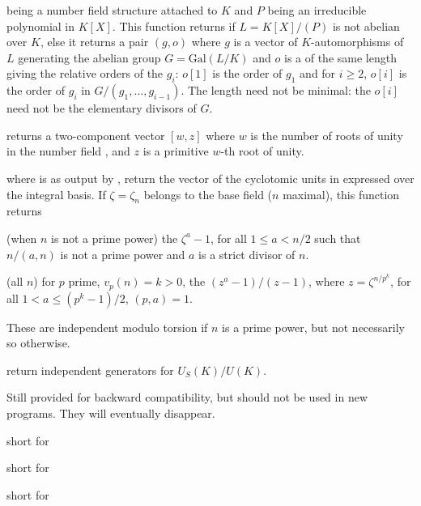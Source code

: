   being a number field
structure attached to $K$ and $P$ being an irreducible polynomial in $K[X]$.
This function returns  if $L = K[X]/(P)$ is not abelian over $K$,
else it returns a pair $(g,o)$ where $g$ is a vector of $K$-automorphisms of
$L$ generating the abelian group $G = \text{Gal}(L/K)$ and $o$ is a
 of the same length giving the relative orders of the $g_i$:
$o[1]$ is the order of $g_1$ and for $i \geq 2$, $o[i]$ is the order of $g_i$ in
$G/(g_1,\dots,g_{i-1})$. The length need not be minimal: the $o[i]$ need not
be the elementary divisors of $G$.


 returns a two-component vector $[w,z]$ where $w$
is the number of roots of unity in the number field , and $z$ is a
primitive $w$-th root of unity.

 where  is as output by
, return the vector of the cyclotomic units in 
expressed over the integral basis. If $\zeta = \zeta_n$ belongs to the base
field ($n$ maximal), this function returns

\item (when $n$ is not a prime power) the $\zeta^a - 1$, for all $1 \leq a <
n/2$ such that $n/(a,n)$ is not a prime power and $a$ is a strict divisor of
$n$.

\item (all $n$) for $p$ prime, $v_p(n) = k > 0$, the $(z^a - 1)/(z - 1)$,  where
$z = \zeta^{n/p^k}$, for all $1 < a \leq (p^k-1) / 2$, $(p, a) = 1$.

These are independent modulo torsion if $n$ is a prime power, but not
necessarily so otherwise.

 return independent generators for
$U_S(K)/U(K)$.


Still provided for backward compatibility, but should not be used in new
programs. They will eventually disappear.

 short for 

short for 

short for 


